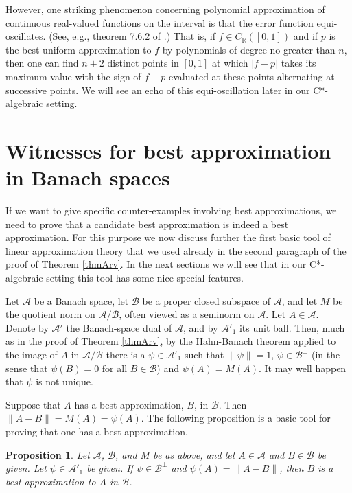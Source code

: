 \documentclass[12pt]{amsart}
\newcommand{\<}{\langle}
\renewcommand{\>}{\rangle}
\newcommand{\cA}{{\mathcal A}}
\newcommand{\cB}{{\mathcal B}}
\newcommand{\cAo}{{\mathcal A}'_1}
\newcommand{\bR}{{\mathbb R}}
\newtheorem{proposition}[theorem]{Proposition}
\theoremstyle{definition}   %
\begin{document}
However, one striking phenomenon concerning polynomial approximation 
of continuous real-valued functions on the interval is that the error function 
equi-oscillates. (See, e.g., theorem 7.6.2 of \cite{Dvs}.) 
That is, if $f \in C_\bR([0,1])$ and if $p$
is the best uniform approximation to $f$ by polynomials of degree no greater than
$n$, then one can find $n+2$ distinct points in $[0,1]$ at which $|f-p|$
takes its maximum value with the sign of $f-p$ evaluated at these
points alternating at successive points. We will see an echo of this 
equi-oscillation later in our C*-algebraic setting. 
                                  

\section{Witnesses for best approximation in Banach spaces}
\label{wit-Ban}

If we want to give specific counter-examples involving best
approximations, we need to prove that a candidate best approximation is
indeed a best approximation. For this purpose 
we now discuss further the first basic tool of linear approximation theory
\cite{Sng} that we used already in the second paragraph of the
proof of Theorem \ref{thmArv}. In the next sections 
we will see that in our C*-algebraic 
setting this tool has some nice special features. 

Let $\cA$ be a Banach space, let $\cB$ be a proper 
closed subspace of $\cA$, and let $M$
be the quotient norm on $\cA / \cB$, often viewed as a seminorm on $\cA$.
Let $A \in \cA$. Denote by $\cA'$ the Banach-space dual of $\cA$, and
by $\cAo$ its unit ball. Then, much as in the proof of Theorem \ref{thmArv}, 
by the Hahn-Banach theorem applied to
the image of $A$ in $\cA / \cB$ there is a $\psi \in \cAo$ such that $\|\psi\| = 1$,
$\psi \in \cB^\perp$ (in the sense that $\psi(B) = 0$ for all $B \in \cB$)
and $\psi(A) = M(A)$. It may well happen that $\psi$ is not unique.

Suppose that $A$ has a best approximation, $B$, in $\cB$. Then
$\|A-B\| = M(A) = \psi(A)$. The following proposition is a basic
tool for proving that one has a best approximation.

\begin{proposition}
\label{prop-wit}
Let $\cA$, $\cB$, and $M$ be as above, and let $A \in \cA$ and
$B \in \cB$ be given. Let $\psi \in \cAo$ be given. If $\psi \in \cB^\perp$
and $\psi(A) = \|A-B\|$, then $B$ is a best approximation to $A$ in $\cB$.
\end{proposition}
\end{document}
